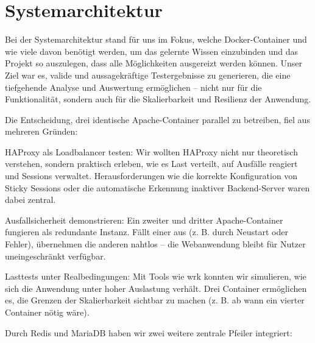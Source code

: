 \section{Systemarchitektur}\label{zitieren}
Bei der Systemarchitektur stand für uns im Fokus, welche Docker-Container und wie viele davon benötigt werden, um das gelernte Wissen einzubinden und das Projekt so auszulegen, dass alle Möglichkeiten ausgereizt werden können. Unser Ziel war es, valide und aussagekräftige Testergebnisse zu generieren, die eine tiefgehende Analyse und Auswertung ermöglichen – nicht nur für die Funktionalität, sondern auch für die Skalierbarkeit und Resilienz der Anwendung. 

Die Entscheidung, drei identische Apache-Container parallel zu betreiben, fiel aus mehreren Gründen: 

HAProxy als Loadbalancer testen: Wir wollten HAProxy nicht nur theoretisch verstehen, sondern praktisch erleben, wie es Last verteilt, auf Ausfälle reagiert und Sessions verwaltet. Herausforderungen wie die korrekte Konfiguration von Sticky Sessions oder die automatische Erkennung inaktiver Backend-Server waren dabei zentral. 

Ausfallsicherheit demonstrieren: Ein zweiter und dritter Apache-Container fungieren als redundante Instanz. Fällt einer aus (z. B. durch Neustart oder Fehler), übernehmen die anderen nahtlos – die Webanwendung bleibt für Nutzer uneingeschränkt verfügbar. 

Lasttests unter Realbedingungen: Mit Tools wie wrk konnten wir simulieren, wie sich die Anwendung unter hoher Auslastung verhält. Drei Container ermöglichen es, die Grenzen der Skalierbarkeit sichtbar zu machen (z. B. ab wann ein vierter Container nötig wäre). 

Durch Redis und MariaDB haben wir zwei weitere zentrale Pfeiler integriert: 

